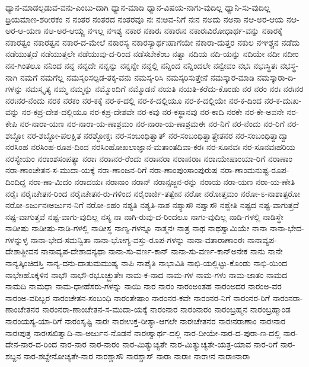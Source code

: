 {ಧ್ಯಾನ-ಮಾಡಲ್ಪಡುವ-ವನು-ಎಂಬು-ದಾಗಿ
ಧ್ಯಾನ-ಮಾಡಿ
ಧ್ಯಾನ-ವಿಷಯ-ನಾಗು-ವುದಿಲ್ಲ
ಧ್ಯಾನಿ-ಸು-ವುದಿಲ್ಲ
ಧ್ರಿಯಮಾಣ-ಶರೀರಕಂ
ನ
ನಂತರ
ನಂತರದ
ನಂತರವೂ
ನಃ
ನಃಅವ-ನಿಗೆ
ನಃನ
ನಅದು
ನಅನಾ
ನಆ-ಅರ-ಆಯ
ನಆ-ಅರ-ಆ-ಯಣ
ನಆ-ಅರ-ಆಯ್ಣ
ನಇಲ್ಲ
ನಇಶ್ಯ
ನಕಾರ
ನಕಾರಃ
ನಕಾರಃನ
ನಕಾರಃವಿರೋಧಾರ್ಥ-ವನ್ನು
ನಕಾರಕ್ಕೆ
ನಕಾರತ್ವಂ
ನಕಾರತ್ವನ
ನಕಾರ-ದ-ಮೇಲೆ
ನಕಾರಸ್ಯ
ನಕಾರಸ್ಯಾರ್ಥಃಹಾಗೆಯೇ
ನಕಾರಾ-ದುತ್ತರ
ನಕುಲ
ನಞಶ್ಚನ
ನಡೆದು
ನಡೆಯುತ್ತದೆ
ನಡೆಯುತ್ತಲೇ
ನಡೆಯುವು-ದ-ರಿಂದ
ನಡೆಸಬೇಕೆಂಬ
ನತ್ವಾ
ನದಿಯ
ನದಿ-ಯನ್ನು
ನದಿಯೇ
ನದೀ
ನದೀಂ
ನನ-ಗಿಂತಲೂ
ನನಿಂದ
ನನ್ನ
ನನ್ನದೇ
ನನ್ನನ್ನು
ನನ್ನನ್ನೇ
ನನ್ನಲ್ಲಿ
ನನ್ನಿಂದ
ನನ್ನಿಂದಲೇ
ನನ್ವೇವಂ
ನಭಃ
ನಭಃಸ್ಥಿತಃ
ನಭಸ್ಥ-ನಾಗಿ
ನಮಗೆ
ನಮಗೆಲ್ಲ
ನಮಸ್ಕರಿಸಲ್ಪಡ-ತಕ್ಕ-ವನು
ನಮಸ್ಕ-ರಿಸಿ
ನಮಸ್ಕರಿಸುತ್ತೇನೆ
ನಮಸ್ಕಾರ-ಮಾಡಿ
ನಮಸ್ಕಾರಾ-ದಿ-ಗಳನ್ನು
ನಮಸ್ಕೃತ್ಯ
ನಮ್ಮ
ನಮ್ಮನ್ನು
ನಮ್ಮೊಂದಿಗೆ
ನಮ್ಮೊಡನೆ
ನಯತಿ
ನಯತಿ-ಕರೆದು-ಕೊಂಡು
ನರ
ನರಂ
ನರಃ
ನರಃನರ
ನರಃನರ-ನೆಂದು
ನರಕ
ನರಕಂ
ನರ-ಕಕ್ಕೆ
ನರ-ಕ-ದಲ್ಲಿ
ನರ-ಕ-ದಲ್ಲಿಯೂ
ನರ-ಕ-ದಲ್ಲಿಯೇ
ನರ-ಕ-ದಿಂದ
ನರ-ಕ-ದುಃಖ-ವನ್ನು
ನರ-ಕಪ್ರ-ದೇಶ-ದಲ್ಲಿಯೂ
ನರ-ಕಪ್ರ-ದೇಶವೇ
ನರ-ಕವು
ನರ-ಕಸ್ಥಾನವು
ನರ-ಕಾದಿ
ನರಕೇ
ನರ-ಕೇ-ಅವನೇ
ನರ-ಕೇಪಿ
ನರ-ನಾರಾ-ಯಣ
ನರ-ನಾರಾ-ಯ-ಣಾಶ್ರಮಂ
ನರ-ನಾರಾ-ಯ-ಣಾಶ್ರಮಈ
ನರ-ನಿಗೆ
ನರ-ನೆಂದು
ನರ-ರಿಗೆ
ನರ-ಶಬ್ದೋ
ನರ-ಶಬ್ದೋ-ಪಲಕ್ಷಿತ
ನರಶ್ಛೋಕ್ತಃ
ನರ-ಸಂಬಂಧಿತ್ವಾತ್
ನರ-ಸಂಬಂಧಿತ್ವಾತ್ಚೇತನರ
ನರ-ಸಂಬಂಧಿತ್ವಾದ್ವಾ
ನರಸಿಂಹ
ನರಸಿಂಹ-ರೂಪ-ದಿಂದ
ನರಸಿಂಹೋಖಲಾಜ್ಞಾನ-ಮತಾಂತದಿವಾ-ಕರಃ
ನರ-ಸೂನವಃ
ನರ-ಸೂನವಃಹರಿಯ
ನರಸ್ಯೇಯಂ
ನರಾಂಶಸಂಪತ್ಯಾ
ನರಾಃ
ನರಾಃನರ-ರೆಂದು
ನರಾಃನರಾ
ನರಾಃನರಾಃ
ನರಾಃಯೇಷಾಂಯಾ-ರಿಗೆ
ನರಾಣಾಂ
ನರಾ-ಣಾಂಚೇತನ-ಸ-ಮುದಾ-ಯಕ್ಕೆ
ನರಾ-ಣಾಂಜನ-ರಿಗೆ
ನರಾ-ಣಾಂಪುಂಸಾಂಪುರುಷ
ನರಾ-ಣಾಂಮನುಷ್ಟ-ರೂಪ-ದಿಂದಿದ್ದ
ನರಾ-ಣಾ-ಮಿದಂ
ನರಾದಯಃ
ನರಾನಾಂ
ನರಾನ್
ನರಾನ್ಸಜ್ಜನ-ರನ್ನು
ನರಾಯ
ನರಾ-ಯಣ
ನರಾ-ಯ-ಣೇತಿ
ನರೈಃ
ನರೈಃಚೇತನ-ರಿಂದ
ನರೈಃಚೇತನ-ರು-ಗಳಿಂದ
ನರೈರಾರ್ಜಿ-ತತ್ವೇನ
ನರೋ
ನರೋತ್ತಮಂ
ನರೋ-ಽ-ನಾಶಾತ್ಪರೋ
ನರೋ-ಽರ್ಜುನಃಅರ್ಜುನ-ನಿಗೆ
ನರೋ-ಽಹಂ
ನಶ್ಯತಿ
ನಶ್ಯತಿ-ನಾಶ
ನಶ್ಯಾಸೌ
ನಶ್ವಾಸೌ
ನಶ್ವೇತಿ
ನಷ್ಟದ
ನಷ್ಟ-ವಾಗುತ್ತದೆ
ನಷ್ಟ-ವಾಗುತ್ತವೆ
ನಷ್ಟ-ವಾಗು-ವುದಿಲ್ಲ
ನಸ್ಯ
ನಾ
ನಾಗಿ-ರುವು-ದ-ರಿಂದಲೂ
ನಾಗು-ವುದಿಲ್ಲ
ನಾಡಿ-ಗಳಲ್ಲಿ
ನಾಡಿಸ್ಥೇ
ನಾಡೀಷು
ನಾಡೀಷು-ನಾಡಿ-ಗಳಲ್ಲಿ
ನಾಡೀಸ್ಥ
ನಾಣ್ಯ-ಗಳನ್ನೂ
ನಾತ್ಮನಃ
ನಾತ್ರ
ನಾಥ
ನಾಥಸ್ವಾಮಿಯೇ
ನಾನಾ
ನಾನಾ-ಭೇದ-ಗಳನ್ನುಳ್ಳ
ನಾನಾ-ಭೇದ-ಸಮನ್ವಿತಾ
ನಾನಾ-ಭೋಗ್ಯ-ವಸ್ತು-ರೂಪ-ಗಳನ್ನು
ನಾನಾ-ವತಾರಾಣಾಂಈ
ನಾನಾವ್ಯಪ-ದೇಶಾತ್ಜೀವನ
ನಾನಾವ್ಯಪ-ದೇಶಾದನ್ಯಥಾ
ನಾನಾ-ಸು-ವರ್ಣ-ಕಾನ್
ನಾನಾ-ಸು-ವರ್ಣ-ಕಾನ್ಅನೇಕ
ನಾನು
ನಾನೇ
ನಾನ್ಯತ್ಕಿಂಚಿದಸ್ತಿ
ನಾನ್ಯ-ದನು-ದಾತುಮಮುಷ್ಯ
ನಾಪಿ
ನಾಪೈತಿ
ನಾಭಾವಿತಿ
ನಾಭಿ-ಯಲ್ಲಿಟ್ಟು-ಕೊಂಡು
ನಾಭಿ-ಯಿಂದ
ನಾಭೇಃಹೊಕ್ಕಳಿನ
ನಾಭೌ
ನಾಭೌ-ರಭೂಚ್ಛ್ರುತೇಃ
ನಾಮ-ಕ-ನಾದ
ನಾಮ-ಗಳ
ನಾಮ-ಗಳು
ನಾಮ-ಜಾತಂ
ನಾಮದ
ನಾಮದಿ
ನಾಮಧಾ
ನಾಮ-ಧಾಃಹೆಸರು-ಗಳನ್ನು
ನಾಯಿ
ನಾರ
ನಾರಂ
ನಾರಂಅಂತಹ
ನಾರಂಅದರ
ನಾರಂಅ-ವರ
ನಾರಂಅ-ವರಿಬ್ಬರ
ನಾರಂಚೇತನ-ಸಂಬಂಧಿ
ನಾರಂತೇಷಾಂ
ನಾರಂನರ-ಕವೇ
ನಾರಂನರ-ನಿಗೆ
ನಾರಂನರ-ರಿಗೆ
ನಾರಂನರಾ-ಣಾಂಚೇತನರ
ನಾರಂನರಾ-ಣಾಂಚೇತನ-ಸ-ಮುದಾ-ಯಕ್ಕೆ
ನಾರಂನಾರ
ನಾರಂನಾರಂ
ನಾರಂಬ್ರಹ್ಮನ
ನಾರಂಬ್ರಹ್ಮಾಂಡ
ನಾರಂಯಸ್ಯ-ಯಾ-ರಿಗೆ
ನಾರಂಸೃಷ್ಟಿ
ನಾರಃ
ನಾರಃಉಕ್ತ-ರೀತ್ಯಾ-ಆಗಲೇ
ನಾರಃಚೇತನರ
ನಾರಃನರಾಣಾಂ
ನಾರಃನಾರ
ನಾರಃಪುತ್ರ
ನಾರಃಸಖಿತ್ವಾದಿ-ನಾ-ಅರ್ಜುನ-ನೊಡನೆ
ನಾರಃಸ್ವಾರ್ಥ-ದಲ್ಲಿ
ನಾರ-ದೀಯೇ-ನಾರ-ದ-ಪುರಾ-ಣ-ದಲ್ಲಿ
ನಾರ-ದೇನ-ನಾರ-ದ-ರಿಂದ
ನಾರ-ನಾರ
ನಾರ-ನಾರಂ
ನಾರ-ಮಿತ್ಯುಚ್ಯತೇ
ನಾರ-ಮಿತ್ಯುಚ್ಯತೇ-ಯತ್ರ-ಯಾವ
ನಾರ-ರಿಗೆ
ನಾರ-ಶಬ್ದನ
ನಾರ-ಶಬ್ದೇನೋಚ್ಯತೇ-ನಾರ
ನಾರಶ್ಚಾಸೌ
ನಾರಶ್ಚಾಸ್
ನಾರಾ
ನಾರಾಃ
ನಾರಾಃನ
ನಾರಾಃನಾರಾ
}
